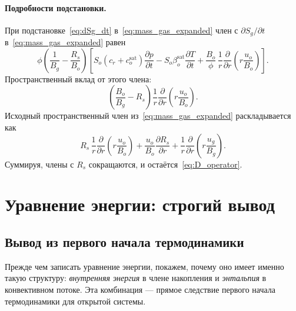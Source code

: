 \documentclass[12pt,a4paper]{article}
\begin{document}
\paragraph{Подробности подстановки.}
При подстановке~\eqref{eq:dSg_dt} в~\eqref{eq:mass_gas_expanded}
член с $\partial S_g/\partial t$ в~\eqref{eq:mass_gas_expanded} равен
\[
  \phi\!\left(\frac{1}{B_g} - \frac{R_s}{B_o}\right)
  \!\left[
    S_o(c_r+c_o^{\mathrm{sat}})\frac{\partial p}{\partial t}
    - S_o\beta_o^{\mathrm{sat}}\frac{\partial T}{\partial t}
    + \frac{B_o}{\phi}\,\frac{1}{r}\frac{\partial}{\partial r}\!
      \left(r\frac{u_o}{B_o}\right)
  \right].
\]
Пространственный вклад от этого члена:
\[
  \left(\frac{B_o}{B_g} - R_s\right)\frac{1}{r}
    \frac{\partial}{\partial r}\!\left(r\frac{u_o}{B_o}\right).
\]
Исходный пространственный член
из~\eqref{eq:mass_gas_expanded} раскладывается как
\[
  R_s\,\frac{1}{r}\frac{\partial}{\partial r}\!\left(r\frac{u_o}{B_o}\right)
  + \frac{u_o}{B_o}\frac{\partial R_s}{\partial r}
  + \frac{1}{r}\frac{\partial}{\partial r}\!\left(r\frac{u_g}{B_g}\right).
\]
Суммируя, члены с $R_s$ сокращаются, и остаётся~\eqref{eq:D_operator}.


\section{Уравнение энергии: строгий вывод}\label{sec:energy}

\subsection{Вывод из первого начала термодинамики}\label{ssec:first_law}

Прежде чем записать уравнение энергии, покажем, почему оно имеет
именно такую структуру: \emph{внутренняя энергия} в члене накопления
и \emph{энтальпия} в конвективном потоке. Эта комбинация --- прямое
следствие первого начала термодинамики для открытой системы.
\end{document}
